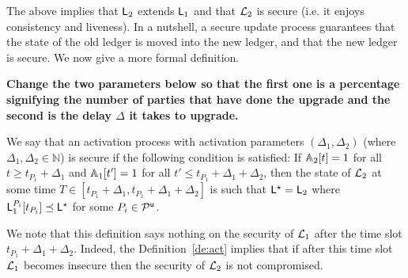 



The above implies that $\mathsf{L}_2$  extends $\mathsf{L}_1$ and that $\mathcal{L}_2$ is secure (i.e. it enjoys consistency and liveness).
In a nutshell, a secure update process guarantees that the state of the old ledger is moved into the new ledger, and that the new ledger is secure.
We now give a more formal definition.

{\bf Change the two parameters below so that the first one is a percentage signifying the number of parties that have done the upgrade and the second is the delay $\Delta$ it takes to upgrade.}

\begin{definition}\label{de:act}
 We say that an activation process with activation parameters $(\Delta_1,\Delta_2)$ (where $\Delta_1,\Delta_2\in\mathbb{N}$) is secure if the following condition is satisfied:
If $\mathbb{A}_2[t]=1$ for all $t\geq t_{P_1}+\Delta_1$ %
and $\mathbb{A}_1[t']=1$ for all $t' \leq t_{P_1}+\Delta_1+\Delta_2$, then the state of $\mathcal{L}_2$ at some time $T\in [t_{P_1}+\Delta_1, t_{P_1}+\Delta_1+\Delta_2]$ is such that $\mathsf{L}^\star=\mathsf{L}_2$ where $  \mathsf{L}_1^{P_i}[t_{P_i}] \preceq \mathsf{L}^\star$ for some $P_i\in\mathcal{P}^\mathsf{u}$.
\end{definition}

We note that this definition says nothing on the security of $\mathcal{L}_1$ after the time slot $t_{P_1}+\Delta_1+\Delta_2$. Indeed, the Definition~\ref{de:act} implies that if
after this time slot $\mathcal{L}_1$ becomes insecure then the security of $\mathcal{L}_2$ is not compromised.



